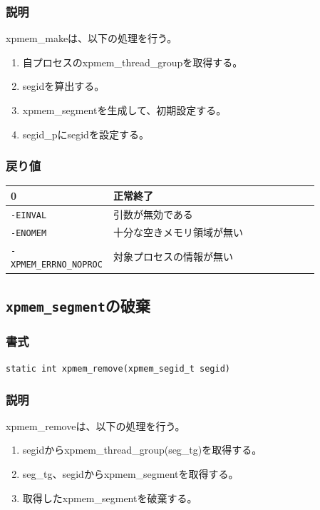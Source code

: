 \documentclass[twoside,11pt,fleqn]{book}
\begin{document}
\subsubsection*{説明}{\quad}
xpmem\_makeは、以下の処理を行う。
\begin{enumerate}
  \item 自プロセスのxpmem\_thread\_groupを取得する。
  \item segidを算出する。
  \item xpmem\_segmentを生成して、初期設定する。
  \item segid\_pにsegidを設定する。
\end{enumerate}

\subsubsection*{戻り値}{\quad}
\begin{table}[!h]
\footnotesize
\begin{tabular}{|p{0.20\linewidth}|p{0.66\linewidth}|} \hline
0&正常終了\\ \hline
\texttt{-EINVAL}&引数が無効である\\ \hline
\texttt{-ENOMEM}&十分な空きメモリ領域が無い\\ \hline
\texttt{-XPMEM\_ERRNO\_NOPROC}&対象プロセスの情報が無い\\ \hline
\end{tabular}
\vspace{-0em}
\end{table}
\FloatBarrier

\subsection{\texttt{xpmem\_segment}の破棄}
\subsubsection*{書式}{\quad}
\texttt{static int xpmem\_remove(xpmem\_segid\_t segid)
}

\subsubsection*{説明}{\quad}
xpmem\_removeは、以下の処理を行う。
\begin{enumerate}
  \item segidからxpmem\_thread\_group(seg\_tg)を取得する。
  \item seg\_tg、segidからxpmem\_segmentを取得する。
  \item 取得したxpmem\_segmentを破棄する。
\end{enumerate}
\end{document}
